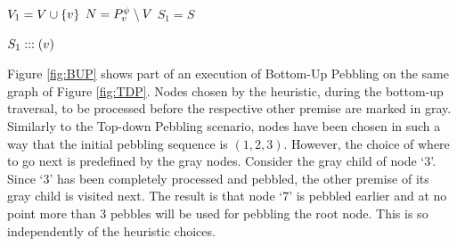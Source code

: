 \documentclass{llncs}
\newcommand{\nodedistance}{0.55cm}
\begin{document}
\begin{algorithm}[h]
	
	$V_1 = V \cup \{v\}$\;
	$N = P_{v}^{\psi} \setminus V$\;
	$S_1 = S$
	
	
	\Return $S_1 ::: (v)$\;
	
  \caption[.]{}
  \label{algo:visit}
\end{algorithm}

\begin{example}
Figure \ref{fig:BUP} shows part of an execution of Bottom-Up Pebbling on the same graph of Figure \ref{fig:TDP}.
Nodes chosen by the heuristic, during the bottom-up traversal, to be processed before the respective other premise are marked in gray. Similarly to the Top-down Pebbling scenario, nodes have been chosen in such a way that the initial pebbling sequence is $(1,2,3)$.
However, the choice of where to go next is predefined by the gray nodes. Consider the gray child of node `$3$'. Since `$3$' has been completely processed and pebbled, the other premise of its gray child is visited next. The result is that node `$7$' is pebbled earlier and at no point more than 3 pebbles will be used for pebbling the root node. This is so independently of the heuristic choices.


\end{example}
\end{document}
